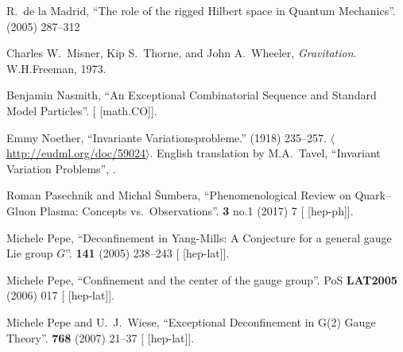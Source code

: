 \begin{thebibliography}{99}
R.~de la Madrid,
``The role of the rigged Hilbert space in Quantum Mechanics''.
  (2005) 287--312 
{\tt{}}

Charles W.~Misner, Kip S.~Thorne, and John A.~Wheeler,
\textit{Gravitation}.
W.H.Freeman, 1973.
\usesOurConventions

Benjamin Nasmith,
``An Exceptional Combinatorial Sequence and Standard Model Particles''.
[ [math.CO]].

Emmy Noether,
``Invariante Variationsprobleme.''
 (1918) 235--257.
$\langle$\url{http://eudml.org/doc/59024}$\rangle$. 
English translation by M.A.~Tavel, ``Invariant Variation Problems'',
.

Roman Pasechnik and Michal \v{S}umbera,
``Phenomenological Review on Quark--Gluon Plasma: Concepts vs.\ Observations''.
 \textbf{3} no.1 (2017) 7
{\tt{}}
[ [hep-ph]].

Michele Pepe,
``Deconfinement in Yang-Mills: A Conjecture for a general gauge Lie group $G$''.
 \textbf{141} (2005) 238--243
{\tt{}}
[ [hep-lat]].

Michele Pepe,
``Confinement and the center of the gauge group''.
PoS \textbf{LAT2005} (2006) 017
{\tt{}}
[ [hep-lat]].

Michele Pepe and U.~J.~Wiese,
``Exceptional Deconfinement in G(2) Gauge Theory''.
 \textbf{768} (2007) 21--37
{\tt{}}
[ [hep-lat]].


\end{thebibliography}
